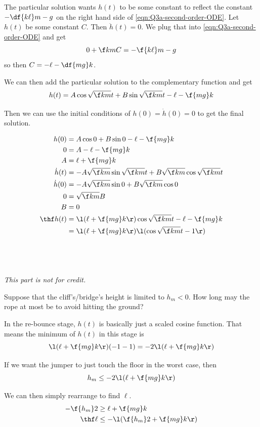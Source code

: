 \documentclass[a4paper]{article}
\begin{document}
The particular solution wants $h(t)$ to be some constant to reflect the constant $-\df{k\ell}m - g$ on the right hand side of \eqref{eqn:Q3a-second-order-ODE}. Let $h(t)$ be some constant $C$. Then $\ddot h(t) = 0$. We plug that into \eqref{eqn:Q3a-second-order-ODE} and get $$0 + \f km C = - \f{k\ell}m - g$$ so then $C = -\ell - \df{mg}k$.

We can then add the particular solution to the complementary function and get \[ h(t) = A \cos \sqrt{\f km} t + B \sin \sqrt{\f km } t - \ell - \f{mg}k \]

Then we can use the initial conditions of $h(0) = \dot h(0) = 0$ to get the final solution.

\begin{align*}
h(0) &= A \cos 0 + B \sin 0 - \ell - \f{mg}k \\
0 &= A - \ell - \f{mg}k \\
A &= \ell + \f{mg}k \\
\dot h(t) &= -A \sqrt{\f km} \sin \sqrt{\f km} t + B \sqrt{\f km} \cos \sqrt{\f km} t \\
\dot h(0) &= -A \sqrt{\f km} \sin 0 + B \sqrt{\f km} \cos 0 \\
0 &= \sqrt{\f km} B \\
B &= 0 \\
\thf h(t) &= \l( \ell + \f{mg}k \r) \cos \sqrt{\f km} t - \ell - \f{mg}k \\
&= \l( \ell + \f{mg}k \r) \l( \cos \sqrt{\f km} t - 1 \r)
\end{align*}

\subsection{~} %

\begin{questionbody}
\textit{This part is not for credit.}

Suppose that the cliff's/bridge's height is limited to $h_m < 0$. How long may the rope at most be to avoid hitting the ground?
\end{questionbody}

In the re-bounce stage, $h(t)$ is basically just a scaled cosine function. That means the minimum of $h(t)$ in this stage is \[ \l( \ell + \f{mg}k \r) (-1 - 1) = -2 \l( \ell + \f{mg}k \r) \]

If we want the jumper to just touch the floor in the worst case, then \[ h_m \le -2\l( \ell + \f{mg}k \r) \]

We can then simply rearrange to find $\ell$. \begin{align*}
-\f{h_m}2 &\ge \ell + \f{mg}k \\
\thf \ell &\le -\l( \f{h_m}2 + \f{mg}k \r)
\end{align*}

\end{document}
